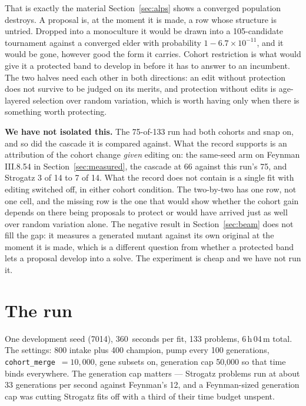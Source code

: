 \documentclass[11pt,a4paper]{article}
\begin{document}
That is exactly the material Section~\ref{sec:alps} shows a converged population
destroys. A proposal is, at the moment it is made, a row whose structure is
untried. Dropped into a monoculture it would be drawn into a 105-candidate
tournament against a converged elder with probability $1 - 6.7\times10^{-11}$,
and it would be gone, however good the form it carries. Cohort restriction is
what would give it a protected band to develop in before it has to answer to an
incumbent. The two halves need each other in both directions: an edit without
protection does not survive
to be judged on its merits, and protection without edits is age-layered
selection over random variation, which is worth having only when there is
something worth protecting.

\textbf{We have not isolated this.} The 75-of-133 run had both cohorts and snap
on, and so did the cascade it is compared against. What the record supports is
an attribution of the cohort change \emph{given} editing on: the same-seed arm
on Feynman III.8.54 in Section~\ref{sec:measured}, the cascade at 66 against
this run's 75, and Strogatz 3 of 14 to 7 of 14. What the record does not contain
is a single fit with editing switched off, in either cohort condition. The
two-by-two has one row, not one cell, and the missing row is the
one that would show whether the cohort gain depends on there being proposals to
protect or would have arrived just as well over random variation alone. The
negative result in Section~\ref{sec:beam} does not fill the gap: it measures a
generated mutant against its own original at the moment it is made, which is a
different question from whether a protected band lets a proposal develop into a
solve. The experiment is cheap and we have not run it.

\section{The run}
\label{sec:results}

One development seed (7014), 360~seconds per fit, 133 problems, 6\,h\,04\,m
total. The settings: 800 intake plus 400 champion, pump every 100 generations,
\texttt{cohort\_merge}~$=10{,}000$, gene subsets on, generation cap 50{,}000 so
that time binds everywhere. The generation cap matters --- Strogatz problems run
at about 33 generations per second against Feynman's 12, and a Feynman-sized
generation cap was cutting Strogatz fits off with a third of their time budget
unspent.
\end{document}
